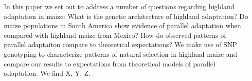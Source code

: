 In this paper we set out to address a number of questions regarding highland adaptation in maize: What is the genetic architecture of highland adaptation? Do maize populations in South America show evidence of parallel adaptation when compared with highland maize from Mexico? How do observed patterns of parallel adaptaiton compare to theoretical expectations?
We make use of SNP genotyping to characterize patterns of natural selection in highland maize and compare our results to expectations from theoretical models of parallel adaptation.  We find X, Y, Z.
